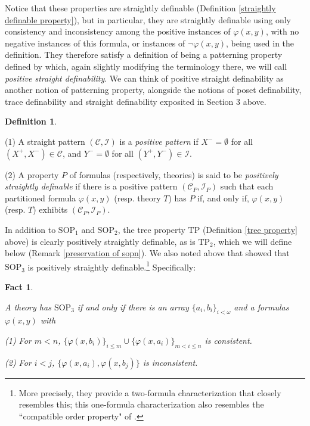 \documentclass{article}
\newcommand{\calC}{\mathcal{C}}
\newcommand{\calI}{\mathcal{I}}
\newcommand{\vphi}{\varphi}
\newtheorem{fact}{Fact}
\theoremstyle{definition}
\newtheorem{definition}{Definition}
\theoremstyle{definition}
\theoremstyle{definition}
\begin{document}
Notice that these properties are straightly definable (Definition \ref{straightly definable property}), but in particular, they are straightly definable using only consistency and inconsistency among the positive instances of $\varphi(x, y)$, with no negative instances of this formula, or instances of $\neg\varphi(x, y)$, being used in the definition. They therefore satisfy a definition of being a patterning property defined by \cite{bailetti2024walk} which, again slightly modifying the terminology there, we will call \textit{positive straight definability}. We can think of positive straight definability as another notion of patterning property, alongside the notions of poset definability, trace definability and straight definability exposited in Section 3 above.

\begin{definition}\label{positively straightly definable property}
    
    (1) A straight pattern $(\mathcal{C}, \mathcal{I})$ is a \textit{positive pattern} if $X^{-} = \emptyset$ for all $(X^{+}, X^{-}) \in \mathcal{C}$, and $Y^{-} = \emptyset$ for all $(Y^{+}, Y^{-}) \in \mathcal{I}$.
    
    
    (2) A property $P$ of formulas (respectively, theories) is said to be \textit{positively straightly definable} if there is a positive pattern $(\calC_P,\calI_P)$ such that each partitioned formula $\vphi(x,y)$ (resp. theory $T$) has $P$ if, and only if, $\vphi(x,y)$ (resp. $T$) exhibits $(\calC_P,\calI_P)$.
\end{definition}

In addition to $\mathrm{SOP}_{1}$ and $\mathrm{SOP}_{2}$, the tree property $\mathrm{TP}$ (Definition \ref{tree property} above) is clearly positively straightly definable, as is $\mathrm{TP}_{2}$, which we will define below (Remark \ref{preservation of sopn}). We also noted above that \cite{shelah_usvyatsov_2008} showed that $\mathrm{SOP}_{3}$ is positively straightly definable.\footnote{More precisely, they provide a two-formula characterization that closely resembles this; this one-formula characterization also resembles the ``compatible order property" of \cite{Mal10}.} Specifically:

\begin{fact}
\label{positive straight definition of sop3}

A theory has $\mathrm{SOP}_{3}$ if and only if there is an array $\{a_{i}, b_{i}\}_{i < \omega}$ and a formulas $\varphi(x, y)$ with

    (1) For $m < n$, $\{\varphi(x, b_{i})\}_{i \leq m} \cup \{\varphi(x, a_{i})\}_{m < i \leq n}$ is consistent.

    (2) For $ i < j$, $\{\varphi(x, a_{i}), \varphi(x, b_{j})\}$ is inconsistent.

    
\end{fact}
\end{document}
